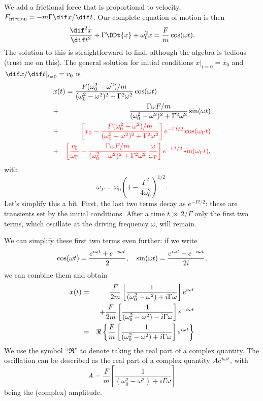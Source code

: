 \begin{sidebar}
We add a frictional force that is proportional to velocity, $F_{\mathrm{friction}} = -m\Gamma \dif x/\dif t$. Our complete equation of motion is then
\begin{equation}
	\DDtt{x} + \Gamma \DDt{x} + \omega_{0}^{2}x = \frac{F}{m}\cos(\omega t).
\end{equation}
The solution to this is straightforward to find, although the algebra is tedious (trust me on this). The general solution for initial conditions $\left.x\right|_{t=0} = x_{0}$ and $\left.\dif x/\dif t\right|_{t=0} = v_{0}$ is
\begin{eqnarray}
\label{e.general-solution-ddo}
\lefteqn{x(t) = \frac{F\womw/m}{\womw^{2}+\gw}\cos(\omega t)} && \\
	&+& \frac{\Gamma\omega F/m}{\womw^{2}+\gw}\sin(\omega t)\nonumber \\
	&+& {\color{red}\left[x_{0}-\frac{F\womw/m}{\womw^{2}+\gw}\right] e^{-\Gamma t/2} \cos(\omega_{\Gamma}t)} \nonumber\\
	&+& {\color{red}\left[\frac{v_{0}}{\omega_{\Gamma}}-\frac{\Gamma\omega F/m}{\womw^{2}+\gw}
	\,\frac{\omega}{\omega_{\Gamma}}\right]e^{-\Gamma t/2} \sin(\omega_{\Gamma}t)}, 
	\nonumber
\end{eqnarray}
with
\[ 
    \omega_{\Gamma} = 
        \omega_{0}\left(1-\frac{\Gamma^{2}}{4\omega_{0}^{2}}\right)^{1/2}.
\]
Let's simplify this a bit.  First, the last two terms decay as $e^{-\Gamma t/2}$: these are transients set by the initial conditions. After a time $t \gg 2/\Gamma$ only the first two terms, which oscillate at the driving frequency $\omega$, will remain. 

We can simplify these first two terms even further: if we write
\[ \cos(\omega t) = \frac{e^{i\omega t}+e^{-i\omega t}}{2},\quad \sin(\omega t) 
    = \frac{e^{i\omega t}-e^{-i\omega t}}{2i}, \]
we can combine them and obtain
\begin{eqnarray}
    x(t) &=& \frac{F}{2m}\left[\frac{1}{\left(\omega_0^2-\omega^2\right) + i\Gamma\omega}\right]e^{i\omega t} \nonumber\\
    && + \frac{F}{2m}\left[\frac{1}{\left(\omega_0^2-\omega^2\right) - i\Gamma\omega}\right]e^{-i\omega t} \nonumber\\
    &=& \Re\left\{\frac{F}{m}\left[\frac{1}{\left(\omega_0^2-\omega^2\right) + i\Gamma\omega}\right]e^{i\omega t}\right\}\label{e.oscillator-expression}
\end{eqnarray}
We use the symbol ``$\Re$'' to denote taking the real part of a complex quantity.
The oscillation can be described as the real part of a complex quantity $Ae^{i\omega t}$, with
\[
    A = \frac{F}{m}\left[\frac{1}{\left(\omega_0^2-\omega^2\right) + i\Gamma\omega}\right]
\]
being the (complex) amplitude.
\end{sidebar} 

